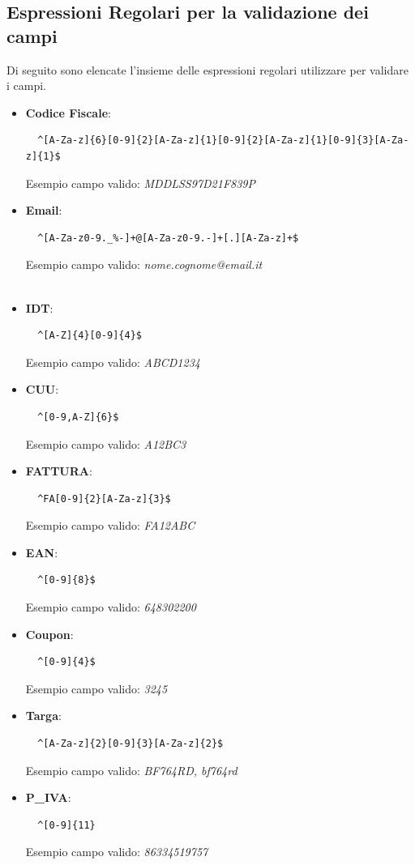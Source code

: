\documentclass[12pt]{report}
\begin{document}
\begin{itemize}
\subsection*{Espressioni Regolari per la validazione dei campi}
Di seguito sono elencate l'insieme delle espressioni regolari utilizzare per validare i campi.
\begin{itemize}
\item \textbf{Codice Fiscale}: \begin{lstlisting}
  ^[A-Za-z]{6}[0-9]{2}[A-Za-z]{1}[0-9]{2}[A-Za-z]{1}[0-9]{3}[A-Za-z]{1}$
\end{lstlisting}
  Esempio campo valido: \textit{MDDLSS97D21F839P}\\
\item \textbf{Email}:\begin{lstlisting}
  ^[A-Za-z0-9._%-]+@[A-Za-z0-9.-]+[.][A-Za-z]+$
\end{lstlisting}
  Esempio campo valido: \textit{nome.cognome@email.it}\\ \\
\item \textbf{IDT}:\begin{lstlisting}
  ^[A-Z]{4}[0-9]{4}$
\end{lstlisting}
  Esempio campo valido: \textit{ABCD1234}\\
\item \textbf{CUU}:\begin{lstlisting}
  ^[0-9,A-Z]{6}$
\end{lstlisting}
  Esempio campo valido: \textit{A12BC3}\\
\item \textbf{FATTURA}:\begin{lstlisting}
  ^FA[0-9]{2}[A-Za-z]{3}$
\end{lstlisting}
  Esempio campo valido: \textit{FA12ABC}\\

\item \textbf{EAN}:\begin{lstlisting}
  ^[0-9]{8}$
\end{lstlisting}
  Esempio campo valido: \textit{648302200}\\
  \item \textbf{Coupon}:\begin{lstlisting}
  ^[0-9]{4}$
\end{lstlisting}
Esempio campo valido: \textit{3245}\\
\item \textbf{Targa}:\begin{lstlisting}
  ^[A-Za-z]{2}[0-9]{3}[A-Za-z]{2}$
\end{lstlisting}
  Esempio campo valido: \textit{BF764RD, bf764rd}\\
\item \textbf{P\_IVA}:\begin{lstlisting}
  ^[0-9]{11}
\end{lstlisting}
  Esempio campo valido: \textit{86334519757}\\
\end{itemize}

\end{itemize}
\end{document}
